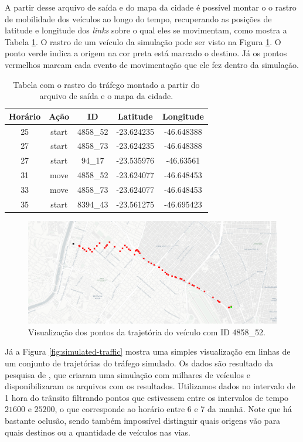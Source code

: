 {  A partir desse arquivo de saída e do mapa da cidade é possível montar o o
rastro de mobilidade dos veículos ao longo do tempo, recuperando as posições de
latitude e longitude dos \emph{links} sobre o qual eles se movimentam, como
mostra a Tabela \ref{table:rastro}. O rastro de um veículo da simulação pode
ser visto na Figura \ref{fig:rastro}. O ponto verde indica a origem na cor
preta está marcado o destino. Já os pontos vermelhos marcam cada evento de
movimentação que ele fez dentro da simulação.

\begin{table}[!htb]
\centering
\begin{tabular}{|c|c|c|c|c|}
\hline
\textbf{Horário} & \textbf{Ação} & \textbf{ID} & \textbf{Latitude} & \textbf{Longitude} \\
\hline
25 & start & 4858\_52 & -23.624235 & -46.648388 \\
27 & start & 4858\_73 & -23.624235 & -46.648388 \\
27 & start & 94\_17 & -23.535976 & -46.63561    \\
31 & move & 4858\_52 & -23.624077 & -46.648453 \\
33 & move & 4858\_73 & -23.624077 & -46.648453 \\
35 & start & 8394\_43 & -23.561275 & -46.695423 \\
\hline
\end{tabular}
\caption{Tabela com o rastro do tráfego montado a partir do arquivo de saída e o mapa da cidade. \label{table:rastro}}
\end{table}

\begin{figure}[!htb]
  \centering
  \includegraphics[width=\textwidth]{../figuras/pontos.png}
  \caption{Visualização dos pontos da trajetória do veículo com ID 4858\_52. \label{fig:rastro}}
\end{figure}

Já a Figura \ref{fig:simulated-traffic} mostra uma simples visualização em linhas
de um conjunto de trajetórias do tráfego simulado. Os dados são resultado
da pesquisa de \citet{santana2018courb}, que criaram uma simulação com milhares
de veículos e disponibilizaram os arquivos com os resultados. Utilizamos dados
no intervalo de 1 hora do trânsito filtrando pontos que estivessem entre os
intervalos de tempo $21600$ e $25200$, o que corresponde ao horário entre 6 e 7
da manhã. Note que há bastante oclusão, sendo também impossível distinguir
quais origens vão para quais destinos ou a quantidade de veículos nas vias.

}

